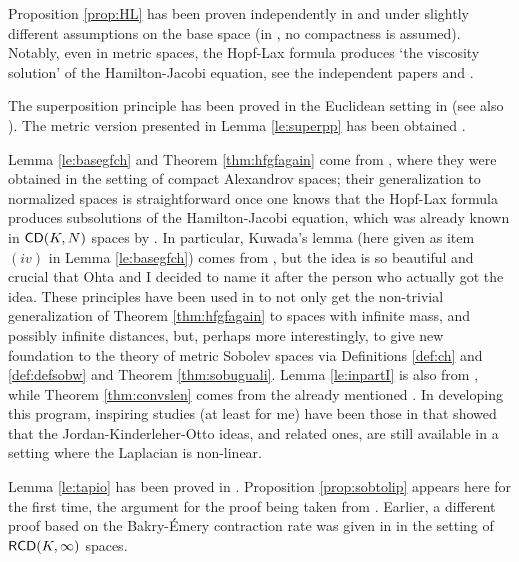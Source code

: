 \documentclass[11pt]{article}
\numberwithin{equation}{section}
\newcommand{\CD}{{\sf CD}}
\newcommand{\RCD}{{\sf RCD}}
\begin{document}
{{Proposition \ref{prop:HL} has been proven independently in \cite{AmbrosioGigliSavare11} and \cite{NCS14} under slightly different assumptions on the base space (in \cite{AmbrosioGigliSavare11}, no compactness is assumed). Notably, even in metric spaces, the Hopf-Lax formula produces `the viscosity solution' of the  Hamilton-Jacobi equation, see the independent papers \cite{AF14} and \cite{GS15}.


The superposition principle has been proved in the Euclidean setting in \cite{Ambrosio04} (see also \cite{AmbrosioGigliSavare08}). The metric version presented in Lemma \ref{le:superpp} has been obtained \cite{Lisini07}.

Lemma \ref{le:basegfch} and Theorem \ref{thm:hfgfagain} come from \cite{Gigli-Kuwada-Ohta10}, where they were obtained in the setting of compact Alexandrov spaces; their generalization to normalized spaces is straightforward once one knows that the Hopf-Lax formula produces subsolutions of the Hamilton-Jacobi equation, which was already known in $\CD(K,N)$ spaces by \cite{LVHJ}. In particular, Kuwada's lemma (here given as item $(iv)$ in Lemma \ref{le:basegfch}) comes from \cite{Gigli-Kuwada-Ohta10}, but the idea is so beautiful and crucial that  Ohta and I decided to name it after the person who actually got the idea. These principles have been used in \cite{AmbrosioGigliSavare11} to not only get  the non-trivial generalization of Theorem \ref{thm:hfgfagain} to spaces with infinite mass, and possibly infinite distances, but, perhaps more interestingly, to give new foundation to the theory of metric Sobolev spaces via Definitions \ref{def:ch} and \ref{def:defsobw} and Theorem \ref{thm:sobuguali}. Lemma \ref{le:inpartI} is also from \cite{AmbrosioGigliSavare11}, while Theorem \ref{thm:convslen} comes from the already mentioned \cite{GMS15}. In developing this program, inspiring studies (at least for me) have been those in  \cite{OhSt09} that showed that the Jordan-Kinderleher-Otto ideas, and related ones, are still available in a setting where the Laplacian is non-linear.




Lemma \ref{le:tapio} has been proved in \cite{Rajala12-2}. Proposition \ref{prop:sobtolip} appears here for the first time, the argument for the proof being taken  from \cite{Gigli13}. Earlier, a different proof based on the Bakry-\'Emery contraction rate was given in \cite{AmbrosioGigliSavare11-2} in the setting of $\RCD(K,\infty)$ spaces.



}}
\end{document}

